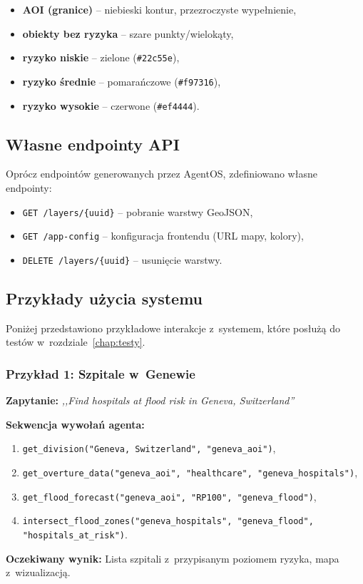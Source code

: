 \begin{itemize}
    \item \textbf{AOI (granice)} -- niebieski kontur, przezroczyste wypełnienie,
    \item \textbf{obiekty bez ryzyka} -- szare punkty/wielokąty,
    \item \textbf{ryzyko niskie} -- zielone (\texttt{\#22c55e}),
    \item \textbf{ryzyko średnie} -- pomarańczowe (\texttt{\#f97316}),
    \item \textbf{ryzyko wysokie} -- czerwone (\texttt{\#ef4444}).
\end{itemize}

\subsection{Własne endpointy API}

Oprócz endpointów generowanych przez AgentOS, zdefiniowano własne endpointy:

\begin{itemize}
    \item \texttt{GET /layers/\{uuid\}} -- pobranie warstwy GeoJSON,
    \item \texttt{GET /app-config} -- konfiguracja frontendu (URL mapy, kolory),
    \item \texttt{DELETE /layers/\{uuid\}} -- usunięcie warstwy.
\end{itemize}

\subsection{Przykłady użycia systemu}

Poniżej przedstawiono przykładowe interakcje z~systemem, które posłużą do testów w~rozdziale~\ref{chap:testy}.

\subsubsection{Przykład 1: Szpitale w~Genewie}

\begin{samepage}
\textbf{Zapytanie:} \textit{,,Find hospitals at flood risk in Geneva, Switzerland''}

\textbf{Sekwencja wywołań agenta:}
\begin{enumerate}
    \item \texttt{get\_division("Geneva, Switzerland", "geneva\_aoi")},
    \item \texttt{get\_overture\_data("geneva\_aoi", "healthcare", "geneva\_hospitals")},
    \item \texttt{get\_flood\_forecast("geneva\_aoi", "RP100", "geneva\_flood")},
    \item \texttt{intersect\_flood\_zones("geneva\_hospitals", "geneva\_flood", "hospitals\_at\_risk")}.
\end{enumerate}

\textbf{Oczekiwany wynik:} Lista szpitali z~przypisanym poziomem ryzyka, mapa z~wizualizacją.
\end{samepage}

